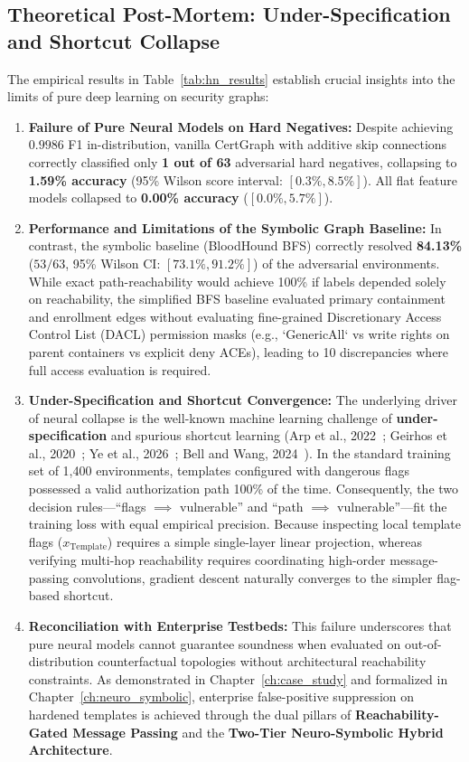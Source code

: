 \subsection{Theoretical Post-Mortem: Under-Specification and Shortcut Collapse}
The empirical results in Table~\ref{tab:hn_results} establish crucial insights into the limits of pure deep learning on security graphs:
\begin{enumerate}
    \item \textbf{Failure of Pure Neural Models on Hard Negatives:} Despite achieving $0.9986$ F1 in-distribution, vanilla CertGraph with additive skip connections correctly classified only \textbf{1 out of 63} adversarial hard negatives, collapsing to \textbf{1.59\% accuracy} (95\% Wilson score interval: $[0.3\%, 8.5\%]$). All flat feature models collapsed to \textbf{0.00\% accuracy} ($[0.0\%, 5.7\%]$).
    \item \textbf{Performance and Limitations of the Symbolic Graph Baseline:} In contrast, the symbolic baseline (BloodHound BFS) correctly resolved \textbf{84.13\%} ($53/63$, 95\% Wilson CI: $[73.1\%, 91.2\%]$) of the adversarial environments. While exact path-reachability would achieve 100\% if labels depended solely on reachability, the simplified BFS baseline evaluated primary containment and enrollment edges without evaluating fine-grained Discretionary Access Control List (DACL) permission masks (e.g., `GenericAll` vs write rights on parent containers vs explicit deny ACEs), leading to 10 discrepancies where full access evaluation is required.
    \item \textbf{Under-Specification and Shortcut Convergence:} The underlying driver of neural collapse is the well-known machine learning challenge of \textbf{under-specification} and spurious shortcut learning (Arp et al., 2022~\cite{arp2022dos}; Geirhos et al., 2020~\cite{geirhos2020shortcut}; Ye et al., 2026~\cite{ye2026cleverhans}; Bell and Wang, 2024~\cite{bell2024pragmatic}). In the standard training set of 1,400 environments, templates configured with dangerous flags possessed a valid authorization path 100\% of the time. Consequently, the two decision rules---``flags $\implies$ vulnerable'' and ``path $\implies$ vulnerable''---fit the training loss with equal empirical precision. Because inspecting local template flags ($x_{\text{Template}}$) requires a simple single-layer linear projection, whereas verifying multi-hop reachability requires coordinating high-order message-passing convolutions, gradient descent naturally converges to the simpler flag-based shortcut.
    \item \textbf{Reconciliation with Enterprise Testbeds:} This failure underscores that pure neural models cannot guarantee soundness when evaluated on out-of-distribution counterfactual topologies without architectural reachability constraints. As demonstrated in Chapter~\ref{ch:case_study} and formalized in Chapter~\ref{ch:neuro_symbolic}, enterprise false-positive suppression on hardened templates is achieved through the dual pillars of \textbf{Reachability-Gated Message Passing} and the \textbf{Two-Tier Neuro-Symbolic Hybrid Architecture}.
\end{enumerate}


